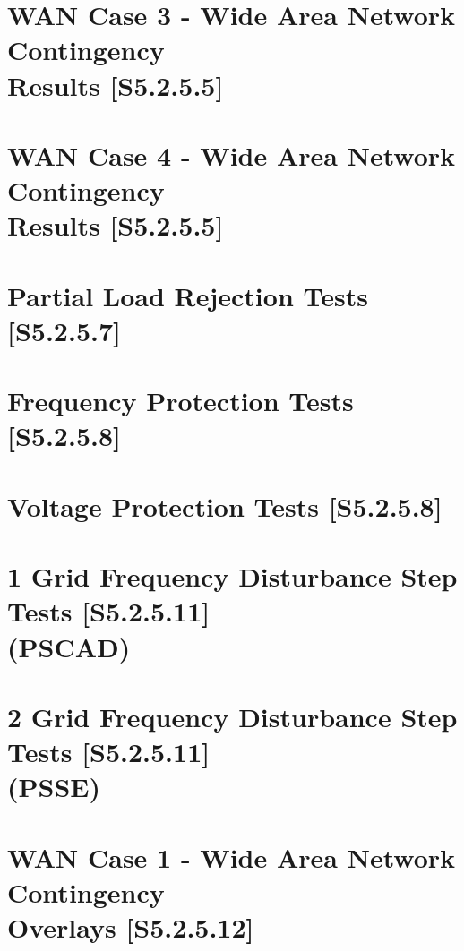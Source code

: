 \documentclass{../grid-link-report}
\begin{document}
	\section{WAN Case 3 - Wide Area Network Contingency 
		\\
		Results [S5.2.5.5]}
	\label{WAN Case 3 - Wide Area Network Contingency Results [S5.2.5.5]}
	
	\section{WAN Case 4 - Wide Area Network Contingency 
		\\
		Results [S5.2.5.5]}
	\label{WAN Case 4 - Wide Area Network Contingency Results [S5.2.5.5]}
	
	\section{Partial Load Rejection Tests [S5.2.5.7]}
	\label{Partial Load Rejection Tests [S5.2.5.7]}
	
	\section{Frequency Protection Tests [S5.2.5.8]}
	\label{Frequency Protection Tests [S5.2.5.8]}	
	
	\section{Voltage Protection Tests [S5.2.5.8]}
	\label{Voltage Protection Tests [S5.2.5.8]}	

	\section{1 Grid Frequency Disturbance Step Tests [S5.2.5.11] 
		\\
		(PSCAD)}
	\label{Grid Frequency Disturbance Step Tests [S5.2.5.11] (PSCAD)}
	
	\section{2 Grid Frequency Disturbance Step Tests [S5.2.5.11] 
		\\
		(PSSE)}
	\label{Grid Frequency Disturbance Step Tests [S5.2.5.11] (PSSE)}
	
	\section{WAN Case 1 - Wide Area Network Contingency 
		\\
		Overlays [S5.2.5.12]}
	\label{WAN Case 1 - Wide Area Network Contingency Overlays [S5.2.5.12]}
	
\end{document}
